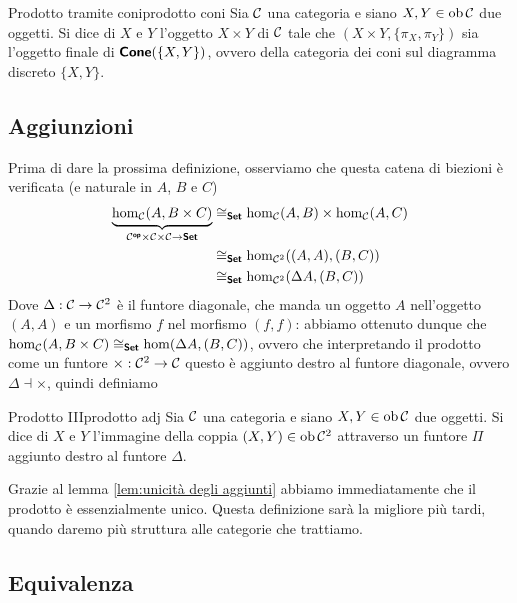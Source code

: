 \documentclass{article}
\renewcommand\C{\mc{C}}
\begin{document}
\begin{definition}{Prodotto tramite coni}{prodotto coni}
    Sia $\C$ una categoria e siano $X,Y \in \ob\C$ due oggetti.
    Si dice  di $X$ e $Y$ l'oggetto $X\times Y$ di $\C$ tale che $(X\times Y, \{\pi_X, \pi_Y\})$ sia l'oggetto finale di $\text{\sffamily\textbf{Cone}}(\{X,Y\})$, ovvero della categoria dei coni sul diagramma discreto $\{X,Y\}$.
\end{definition}

\subsection{Aggiunzioni}

Prima di dare la prossima definizione, osserviamo che questa catena di biezioni è verificata (e naturale in $A$, $B$ e $C$)
\[\begin{aligned}
    \underbrace{\hom_\C(A, B\times C)}_{\C^\op \times \C\times\C \to \setcat} & \cong_\setcat \hom_\C(A,B)\times \hom_\C(A,C)\\
    & \cong_\setcat \hom_{\C^2}((A,A),(B,C))\\
    & \cong_\setcat \hom_{\C^2}(\Delta A,(B,C))
\end{aligned}\]
Dove $\Delta:\C\to\C^2$ è il funtore diagonale, che manda un oggetto $A$ nell'oggetto $(A,A)$ e un morfismo $f$ nel morfismo $(f,f)$: abbiamo ottenuto dunque che $\hom_\C(A, B\times C) \cong_\setcat \hom(\Delta A, (B,C))$, ovvero che interpretando il prodotto come un funtore $\times: \C^2\to\C$ questo è aggiunto destro al funtore diagonale, ovvero $\Delta \dashv \times$, quindi definiamo

\begin{definition}{Prodotto III}{prodotto adj}
    Sia $\C$ una categoria e siano $X,Y \in \ob\C$ due oggetti. 
    Si dice  di $X$ e $Y$ l'immagine della coppia $(X,Y) \in \ob\C^2$ attraverso un funtore $\Pi$ aggiunto destro al funtore $\Delta$.
\end{definition}

Grazie al lemma \ref{lem:unicità degli aggiunti} abbiamo immediatamente che il prodotto è essenzialmente unico. Questa definizione sarà la migliore più tardi, quando daremo più struttura alle categorie che trattiamo.

\subsection{Equivalenza}
\end{document}
